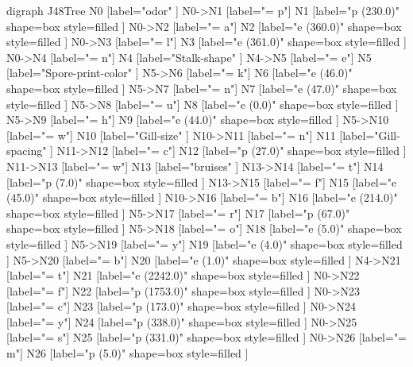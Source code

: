 digraph J48Tree {
N0 [label="odor" ]
N0->N1 [label="= p"]
N1 [label="p (230.0)" shape=box style=filled ]
N0->N2 [label="= a"]
N2 [label="e (360.0)" shape=box style=filled ]
N0->N3 [label="= l"]
N3 [label="e (361.0)" shape=box style=filled ]
N0->N4 [label="= n"]
N4 [label="Stalk-shape" ]
N4->N5 [label="= e"]
N5 [label="Spore-print-color" ]
N5->N6 [label="= k"]
N6 [label="e (46.0)" shape=box style=filled ]
N5->N7 [label="= n"]
N7 [label="e (47.0)" shape=box style=filled ]
N5->N8 [label="= u"]
N8 [label="e (0.0)" shape=box style=filled ]
N5->N9 [label="= h"]
N9 [label="e (44.0)" shape=box style=filled ]
N5->N10 [label="= w"]
N10 [label="Gill-size" ]
N10->N11 [label="= n"]
N11 [label="Gill-spacing" ]
N11->N12 [label="= c"]
N12 [label="p (27.0)" shape=box style=filled ]
N11->N13 [label="= w"]
N13 [label="bruises" ]
N13->N14 [label="= t"]
N14 [label="p (7.0)" shape=box style=filled ]
N13->N15 [label="= f"]
N15 [label="e (45.0)" shape=box style=filled ]
N10->N16 [label="= b"]
N16 [label="e (214.0)" shape=box style=filled ]
N5->N17 [label="= r"]
N17 [label="p (67.0)" shape=box style=filled ]
N5->N18 [label="= o"]
N18 [label="e (5.0)" shape=box style=filled ]
N5->N19 [label="= y"]
N19 [label="e (4.0)" shape=box style=filled ]
N5->N20 [label="= b"]
N20 [label="e (1.0)" shape=box style=filled ]
N4->N21 [label="= t"]
N21 [label="e (2242.0)" shape=box style=filled ]
N0->N22 [label="= f"]
N22 [label="p (1753.0)" shape=box style=filled ]
N0->N23 [label="= c"]
N23 [label="p (173.0)" shape=box style=filled ]
N0->N24 [label="= y"]
N24 [label="p (338.0)" shape=box style=filled ]
N0->N25 [label="= s"]
N25 [label="p (331.0)" shape=box style=filled ]
N0->N26 [label="= m"]
N26 [label="p (5.0)" shape=box style=filled ]
}

